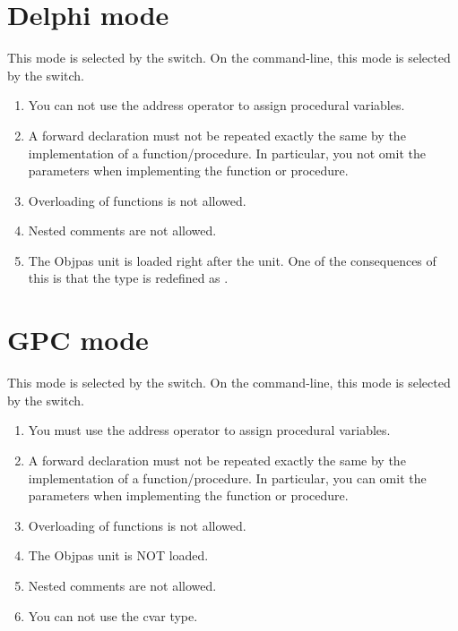 {\section{Delphi mode}
This mode is selected by the  switch. On the command-line,
this mode is selected by the  switch.
\begin{enumerate}
\item You can not use the address operator to assign procedural variables.
\item A forward declaration must not be repeated exactly the same by the
implementation of a function/procedure. In particular, you not omit the
parameters when implementing the function or procedure.
\item Overloading of functions is not allowed.
\item Nested comments are not  allowed.
\item The Objpas unit is loaded right after the  unit. One of the
consequences of this is that the type  is redefined as
.
\end{enumerate}
\section{GPC mode}
This mode is selected by the  switch. On the command-line,
this mode is selected by the  switch.
\begin{enumerate}
\item You must use the address operator to assign procedural variables.
\item A forward declaration must not be repeated exactly the same by the
implementation of a function/procedure. In particular, you can omit the
parameters when implementing the function or procedure.
\item Overloading of functions is not allowed.
\item The Objpas unit is NOT loaded.
\item Nested comments are not allowed.
\item You can not use the cvar type.
\end{enumerate}
}
